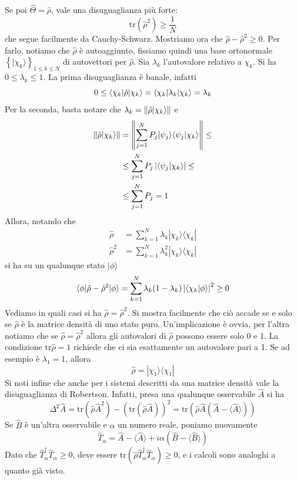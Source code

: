 \documentclass[a4paper, 11pt]{article}
\newcommand{\tr}{\mathrm{tr}}
\renewcommand{\ket}[1]{| #1\rangle}
\renewcommand{\bra}[1]{\langle #1|}
\begin{document}
Se poi $\hat{\Theta}=\hat{\rho}$, vale una disuguaglianza più forte:
\[\tr(\hat{\rho}^2)\geq\frac{1}{N}\]
che segue facilmente da Cauchy-Schwarz. Mostriamo ora che $\hat{\rho}-\hat{\rho}^2\geq0$. Per farlo, notiamo che $\hat{\rho}$ è autoaggiunto, fissiamo quindi una base ortonormale $\left\{\ket{\chi_k}\right\}_{1\leq k\leq N}$ di autovettori per $\hat{\rho}$. Sia $\lambda_k$ l'autovalore relativo a $\chi_k$. Si ha $0\leq\lambda_k\leq1$. La prima disuguaglianza è banale, infatti
\[0\leq\langle\chi_k|\hat{\rho}|\chi_k\rangle=\langle\chi_k|\lambda_k|\chi_k\rangle=\lambda_k\]
Per la seconda, basta notare che $\lambda_k=\norm {\hat{\rho}\ket{\chi_k}}$ e
\begin{align*}
	\norm{\hat{\rho}\ket{\chi_k}}&=\norm {\sum_{j=1}^{N}P_j\ket{\psi_j}\braket{\psi_j}{\chi_k}}\leq\\&\leq\sum_{j=1}^{N}P_j\left|\braket{\psi_j}{\chi_k}\right|\leq\\&\leq\sum_{j=1}^{N}P_j=1
\end{align*}
Allora, notando che
\begin{align*}
	\hat{\rho}&=\sum_{k=1}^{N}\lambda_k\ket{\chi_k}\bra{\chi_k}\\\hat{\rho}^2&=\sum_{k=1}^{N}\lambda^2_k\ket{\chi_k}\bra{\chi_k}
\end{align*}
si ha su un qualunque stato $\ket{\phi}$
\[\langle\phi|\hat{\rho}-\hat{\rho}^2|\phi\rangle=\sum_{k=1}^{N}\lambda_k(1-\lambda_k)\left|\langle \chi_k\vert\phi\rangle\right|^2\geq0\]
Vediamo in quali casi si ha $\hat{\rho}=\hat{\rho}^2$. Si mostra facilmente che ciò accade se e solo se $\hat{\rho}$ è la matrice densità di uno stato puro. Un'implicazione è ovvia, per l'altra notiamo che se $\hat{\rho}=\hat{\rho}^2$ allora gli autovalori di $\hat{\rho}$ possono essere solo 0 e 1. La condizione $\tr\hat{\rho}=1$ richiede che ci sia esattamente un autovalore pari a 1. Se ad esempio è $\lambda_1=1$, allora
\[\hat{\rho}=\ket{\chi_1}\bra{\chi_1}\]
Si noti infine che anche per i sistemi descritti da una matrice densità vale la disuguaglianza di Robertson. Infatti, presa una qualunque osservabile $\hat{A}$ si ha
\[\Delta^2\hat{A}=\tr(\hat{\rho}\hat{A}^2)-\left(\tr(\hat\rho\hat{A})\right)^2=\tr\left(\hat{\rho}\hat{A}(\hat{A}-\langle\hat{A}\rangle)\right)\]
Se $\hat{B}$ è un'altra osservabile e $\alpha$ un numero reale, poniamo nuovamente
\[\hat{T}_\alpha=\hat{A}-\langle\hat{A}\rangle+i\alpha(\hat{B}-\langle\hat{B}\rangle)\]
Dato che $\hat{T}^\dagger_\alpha\hat{T}_\alpha\geq0$, deve essere $\tr(\hat{\rho}\hat{T}^\dagger_\alpha\hat{T}_\alpha)\geq0$, e i calcoli sono analoghi a quanto già visto.
\end{document}
